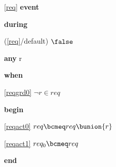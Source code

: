 \noindent \ref{req}  \textbf{event}
\begin{block}
  \item   \textbf{during}
  \begin{block}
  \item[ (\ref{req}/default) ]{$\false$} %
  \end{block}
  \item   \textbf{any} r
  \item   \textbf{when}
  \begin{block}
  \item[ \eqref{reqgrd0} ]{$\neg r \in req$} %
  \end{block}
  \item   \textbf{begin}
  \begin{block}
  \item[ \eqref{reqact0} ]{$req \bcmeq req \bunion \{ r \}$} %
  \item[ \eqref{reqact1} ]{$req_0 \bcmeq req$} %
  \end{block}
  \item   \textbf{end} \\
\end{block}
